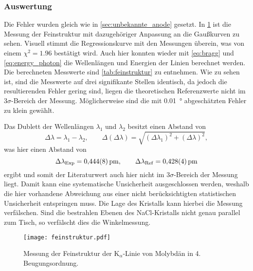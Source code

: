 \subsubsection{Auswertung}

Die Fehler wurden gleich wie in \cref{sec:unbekannte_anode} gesetzt. In \cref{fig:feinstruktur} ist die 
Messung der Feinstruktur mit dazugehöriger Anpassung an die Gaußkurven zu sehen. Visuell stimmt die Regressionskurve 
mit den Messungen überein, was von einem $\chi^2 = 1.96$ bestätigt wird. Auch hier konnten wieder mit 
\cref{eq:bragg} und \cref{eq:energy_photon} die Wellenlängen und Energien der Linien berechnet werden. 
Die berechneten Messwerte sind \cref{tab:feinstruktur} zu entnehmen. Wie zu sehen ist, sind die Messwerte 
auf drei signifikante Stellen identisch, da jedoch die resultierenden Fehler gering sind, liegen die 
theoretischen Referenzwerte nicht im $3\sigma$-Bereich der Messung. Möglicherweise sind die mit \SI{0.01}{\degree}
abgeschätzten Fehler zu klein gewählt.\par 
Das Dublett der Wellenlängen $\lambda_1$ und $\lambda_2$ besitzt einen Abstand von 
\begin{equation*}
	\Delta\lambda = \lambda_1 - \lambda_2,\qquad \Delta(\Delta\lambda) = 
	\sqrt{(\Delta\lambda_1)^2+ (\Delta\lambda)^2},
\end{equation*}
was hier einen Abstand von 
\begin{equation}
	\Delta\lambda_\mathrm{Exp} = \SI{0.444\pm 0.008}{\pm},\qquad
	\Delta\lambda_\mathrm{Ref} = \SI{0.428\pm0.004}{\pm}
\end{equation}
ergibt und somit der Literaturwert auch hier nicht im $3\sigma$-Bereich der Messung liegt. Damit kann eine 
systematische Unsicherheit ausgeschlossen werden, weshalb die hier vorhandene Abweichung 
aus einer nicht berücksichtigten statistischen Unsicherheit entspringen muss. Die Lage des Kristalls 
kann hierbei die Messung verfälschen. Sind die bestrahlen Ebenen des NaCl-Kristalls nicht 
genau parallel zum Tisch, so verfälscht dies die Winkelmessung.

\begin{figure}[htb]
	\centering
	\texttt{[image: feinstruktur.pdf]}
	\caption{Messung der Feinstruktur der K$_\alpha$-Linie von Molybdän in 4. Beugungsordnung.}
	\label{fig:feinstruktur}
\end{figure}

